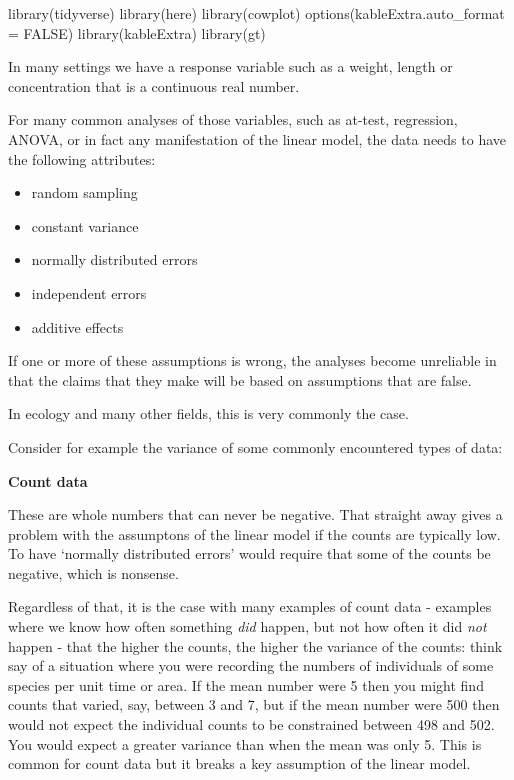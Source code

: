 \documentclass[
  letterpaper,
  DIV=11,
  numbers=noendperiod]{scrreprt}
\newenvironment{Shaded}{\begin{snugshade}}{\end{snugshade}}
\newcommand{\AttributeTok}[1]{\textcolor[rgb]{0.40,0.45,0.13}{#1}}
\newcommand{\ConstantTok}[1]{\textcolor[rgb]{0.56,0.35,0.01}{#1}}
\newcommand{\FunctionTok}[1]{\textcolor[rgb]{0.28,0.35,0.67}{#1}}
\newcommand{\NormalTok}[1]{\textcolor[rgb]{0.00,0.23,0.31}{#1}}
\providecommand{\tightlist}{%
  \setlength{\itemsep}{0pt}\setlength{\parskip}{0pt}}\usepackage{longtable,booktabs,array}
\begin{document}
\begin{Shaded}
\begin{Highlighting}[]
\FunctionTok{library}\NormalTok{(tidyverse)}
\FunctionTok{library}\NormalTok{(here)}
\FunctionTok{library}\NormalTok{(cowplot)}
\FunctionTok{options}\NormalTok{(}\AttributeTok{kableExtra.auto\_format =} \ConstantTok{FALSE}\NormalTok{)}
\FunctionTok{library}\NormalTok{(kableExtra)}
\FunctionTok{library}\NormalTok{(gt)}
\end{Highlighting}
\end{Shaded}

In many settings we have a response variable such as a weight, length or
concentration that is a continuous real number.

For many common analyses of those variables, such as at-test,
regression, ANOVA, or in fact any manifestation of the linear model, the
data needs to have the following attributes:

\begin{itemize}
\tightlist
\item
  random sampling
\item
  constant variance
\item
  normally distributed errors
\item
  independent errors
\item
  additive effects
\end{itemize}

If one or more of these assumptions is wrong, the analyses become
unreliable in that the claims that they make will be based on
assumptions that are false.

In ecology and many other fields, this is very commonly the case.

Consider for example the variance of some commonly encountered types of
data:

\textbf{Count data}

These are whole numbers that can never be negative. That straight away
gives a problem with the assumptons of the linear model if the counts
are typically low. To have `normally distributed errors' would require
that some of the counts be negative, which is nonsense.

Regardless of that, it is the case with many examples of count data -
examples where we know how often something \emph{did} happen, but not
how often it did \emph{not} happen - that the higher the counts, the
higher the variance of the counts: think say of a situation where you
were recording the numbers of individuals of some species per unit time
or area. If the mean number were 5 then you might find counts that
varied, say, between 3 and 7, but if the mean number were 500 then would
not expect the individual counts to be constrained between 498 and 502.
You would expect a greater variance than when the mean was only 5. This
is common for count data but it breaks a key assumption of the linear
model.
\end{document}

